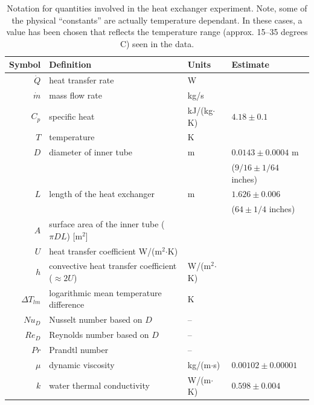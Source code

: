 \documentclass[twoside]{book}\usepackage[]{graphicx}\usepackage[]{xcolor}
\begin{document}
\begin{table}
\caption{Notation for quantities involved in the heat exchanger experiment. 
Note, some of the physical ``constants'' are actually temperature dependant.  
In these cases, a value has been chosen that reflects the temperature range 
(approx. 15--35 degrees C) seen in the data.}
\begin{center}
\begin{tabular}{r @{\hspace{2em}} lll}
  \toprule
	Symbol           &   Definition & Units & Estimate\\
	\midrule
	$\dot{Q}$ &  heat transfer rate & W  &\\
	$\dot{m}$ &  mass flow rate & kg/s & \\
	$C_{p}$   &  specific heat & kJ/(kg$\cdot$K) & $4.18 \pm 0.1$ \\ %
	$T$       & temperature & K & \\
	$D$       & diameter of inner tube & m & $0.0143 \pm 0.0004$ m \\
	          & && ($9/16 \pm 1/64$ inches) \\
	$L$       & length of the heat exchanger & m &  $1.626 \pm 0.006$ \\
	          &                              &   &  ($64 \pm 1/4$ inches) \\
	$A$       & surface area of the inner tube ($\pi D L$) [m$^{2}$] \\
	$U$       & heat transfer coefficient W/(m$^{2}$$\cdot$K) & \\
	$h$		  & convective heat transfer coefficient ($\approx 2 U$) & W/(m$^2$$\cdot$K) & \\
	$\Delta T_{lm}$ & logarithmic mean temperature difference & K & \\
	$Nu_{D}$  & Nusselt number based on $D$ & -- & \\
	$Re_{D}$  & Reynolds number based on $D$ & -- & \\
	$Pr$      & Prandtl number & -- & \\
	$\mu$     & dynamic viscosity & kg/(m$\cdot$s) & $0.00102 \pm 0.00001$ \\
	$k$      & water thermal conductivity & W/(m$\cdot$K) & $0.598 \pm 0.004$\\
	\bottomrule
\end{tabular}
\end{center}
\label{tab:definitions}
\end{table}
\end{document}
